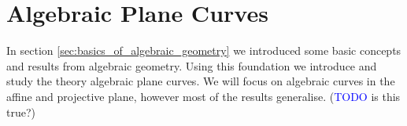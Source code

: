 \chapter{Algebraic Plane Curves}\label{sec:algebraic_curves}
In section \ref{sec:basics_of_algebraic_geometry} we introduced some basic concepts and results from algebraic geometry. Using this foundation we introduce and study the theory algebraic plane curves. We will focus on algebraic curves in the affine and projective plane, however most of the results generalise. (\textcolor{blue}{TODO} is this true?)




